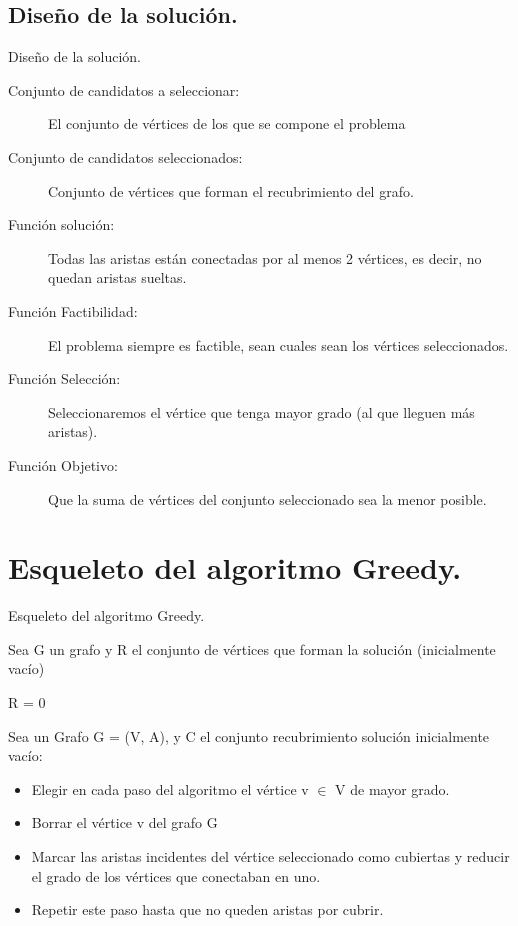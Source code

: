 \documentclass[10pt]{beamer}
\begin{document}
\subsection{Diseño de la solución.}
\begin{frame}{Diseño de la solución.}{}
\begin{description}
	\item [Conjunto de candidatos a seleccionar:] El conjunto de vértices de los que se compone el problema
	
	\item [Conjunto de candidatos seleccionados:] Conjunto de vértices que forman el recubrimiento del grafo.
	
	\item [Función solución:] Todas las aristas están conectadas por al menos 2 vértices, es decir, no quedan aristas sueltas.
	
	\item [Función Factibilidad:] El problema siempre es factible, sean cuales sean los vértices seleccionados.
	
	\item [Función Selección:] Seleccionaremos el vértice que tenga mayor grado (al que lleguen más aristas).
	
	\item [Función Objetivo:] Que la suma de vértices del conjunto seleccionado sea la menor posible.
\end{description}

\end{frame}

\section{Esqueleto del algoritmo Greedy.}
\begin{frame}{Esqueleto del algoritmo Greedy.}
  
  Sea G un grafo y R el conjunto de vértices que forman la solución (inicialmente vacío)
  
  R = 0
  
  Sea un Grafo G = (V, A), y C el conjunto recubrimiento solución inicialmente vacío:
  \pause
  \begin{itemize}
  \item Elegir en cada paso del algoritmo el vértice v $\in$ V de mayor grado.
  \pause
  \item Borrar el vértice v del grafo G
  \pause
  \item Marcar las aristas incidentes del vértice seleccionado como cubiertas y reducir el grado de los vértices que conectaban en uno.
  \pause
  \item Repetir este paso hasta que no queden aristas por cubrir.
  \end{itemize}
\end{frame}
\end{document}
